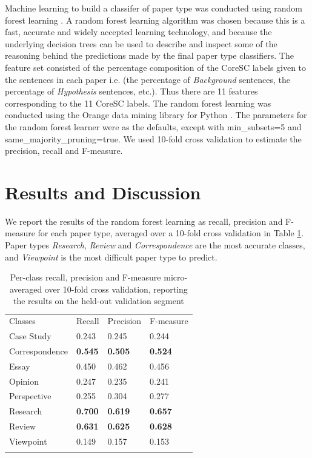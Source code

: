 \documentclass{svmult}
\begin{document}

Machine learning to build a classifer of paper type was conducted using random
forest learning \cite{Breiman2001}.  A random forest learning algorithm was
chosen because this is a fast, accurate and widely accepted learning
technology, and because the underlying decision trees can be used to describe
and inspect some of the reasoning behind the predictions made by the final
paper type classifiers.  The feature set consisted of the percentage
composition of the CoreSC labels given to the sentences in each paper i.e. (the
percentage of {\em Background} sentences, the percentage of {\em Hypothesis}
sentences, etc.).  Thus there are 11 features corresponding to the 11 CoreSC
labels.  The random forest learning was conducted using the Orange data mining
library for Python \cite{Curk2005}.  The parameters for the random forest
learner were as the defaults, except with min\_subsets=5 and same\_majority\_pruning=true.  
We used 10-fold cross validation to estimate the precision,
recall and F-measure.


\section{Results and Discussion}
\label{sec:3}

We report the results of the random forest learning as recall, precision and F-measure for each paper type, averaged over a 10-fold cross validation in Table \ref{tab:recallPrecision}. Paper types {\em Research}, {\em Review} and {\em Correspondence} are the most accurate classes, and {\em Viewpoint} is the most difficult paper type to predict.

\begin{table}
\caption{Per-class recall, precision and F-measure micro-averaged over 10-fold cross validation, reporting the results on the held-out validation segment}
\label{tab:recallPrecision}       %
\begin{tabular}{p{2cm}p{2.4cm}p{2cm}p{4.9cm}}
\hline\noalign{\smallskip}
Classes & Recall & Precision & F-measure  \\
\noalign{\smallskip}\svhline\noalign{\smallskip}
Case Study   &     0.243    &    0.245     &   0.244 \\
Correspondence  &     {\bf  0.545}    &    {\bf 0.505}    &    {\bf 0.524} \\ 
Essay     &   0.450     &   0.462    &    0.456 \\
Opinion   &     0.247    &    0.235  &      0.241 \\   
Perspective &       0.255  &      0.304  &       0.277 \\
Research     &   {\bf 0.700}    &    {\bf 0.619}    &    {\bf 0.657} \\
Review      &  {\bf 0.631}     &   {\bf 0.625}     &   {\bf 0.628} \\
Viewpoint   &     0.149     &   0.157  &      0.153 \\
\noalign{\smallskip}\hline\noalign{\smallskip}
\end{tabular}
\end{table}
\end{document}
